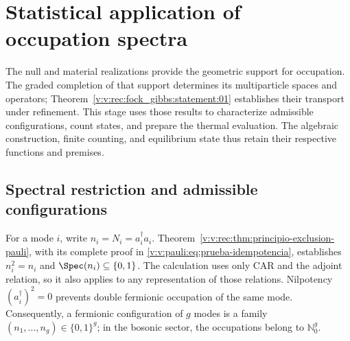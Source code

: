 \section{Statistical application of occupation spectra}
\label{v:v:rec:chap:ocupacion-estadistica}

The null and material realizations provide the geometric support for
occupation. The graded completion of that support determines its
multiparticle spaces and operators;
Theorem~\ref{v:v:rec:fock_gibbs:statement:01} establishes their transport under
refinement. This stage uses those results to characterize
admissible configurations, count states, and prepare the thermal evaluation.
The algebraic construction, finite counting, and equilibrium state
thus retain their respective functions and premises.

\subsection{Spectral restriction and admissible configurations}
\label{v:v:rec:pauli:section:02}

For a mode \(i\), write \(n_i=N_i=a_i^\dagger a_i\).
Theorem~\ref{v:v:rec:thm:principio-exclusion-pauli}, with its complete proof in
\eqref{v:v:pauli:eq:prueba-idempotencia}, establishes
\(n_i^2=n_i\) and \(\Spec(n_i)\subseteq\{0,1\}\). The calculation uses
only CAR and the adjoint relation, so it also applies
to any representation of those relations. Nilpotency
\((a_i^\dagger)^2=0\) prevents double fermionic occupation of the same mode.
Consequently, a fermionic configuration of \(g\) modes is a
family \((n_1,\ldots,n_g)\in\{0,1\}^g\); in the bosonic sector, the
occupations belong to \(\mathbb N_0^g\).

